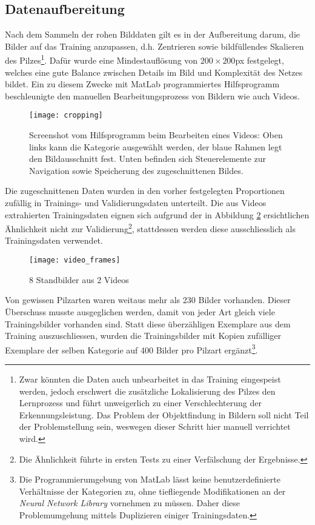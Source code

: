 \subsection{Datenaufbereitung} \label{cha:met:preprocessing}
Nach dem Sammeln der rohen Bilddaten gilt es in der Aufbereitung darum, die Bilder auf das Training anzupassen, d.h. Zentrieren sowie bildfüllendes Skalieren des Pilzes\footnote{Zwar könnten die Daten auch unbearbeitet in das Training eingespeist werden, jedoch erschwert die zusätzliche Lokalisierung des Pilzes den Lernprozess und führt unweigerlich zu einer Verschlechterung der Erkennungsleistung. Das Problem der Objektfindung in Bildern soll nicht Teil der Problemstellung sein, weswegen dieser Schritt hier manuell verrichtet wird.}. Dafür wurde eine Mindestauflösung von $200 \times 200$px festgelegt, welches eine gute Balance zwischen Details im Bild und Komplexität des Netzes bildet. Ein zu diesem Zwecke mit MatLab programmiertes Hilfsprogramm beschleunigte den manuellen Bearbeitungsprozess von Bildern wie auch Videos.
\begin{figure}[h]
	\centering
	\texttt{[image: cropping]}
	\caption[\textit{\textit{Hilfsprogramm}}]{Screenshot vom Hilfsprogramm beim Bearbeiten eines Videos: Oben links kann die Kategorie ausgewählt werden, der blaue Rahmen legt den Bildausschnitt fest. Unten befinden sich Steuerelemente zur Navigation sowie Speicherung des zugeschnittenen Bildes.}
	\label{img:precrocessing}
\end{figure}

Die zugeschnittenen Daten wurden in den vorher festgelegten Proportionen zufällig in Trainings- und Validierungsdaten unterteilt. Die aus Videos extrahierten Trainingsdaten eignen sich aufgrund der in Abbildung \ref{img:video_frames} ersichtlichen Ähnlichkeit nicht zur Validierung\footnote{Die Ähnlichkeit führte in ersten Tests zu einer Verfälschung der Ergebnisse.}, stattdessen werden diese ausschliesslich als Trainingsdaten verwendet.

\begin{figure}[h]
	\centering
	\texttt{[image: video\_frames]}
	\caption[\textit{\textit{Video-Frames}}]{8 Standbilder aus 2 Videos}
	\label{img:video_frames}
\end{figure}

Von gewissen Pilzarten waren weitaus mehr als 230 Bilder vorhanden. Dieser Überschuss musste ausgeglichen werden, damit von jeder Art gleich viele Trainingsbilder vorhanden sind. Statt diese überzähligen Exemplare aus dem Training auszuschliessen, wurden die Trainingsbilder mit Kopien zufälliger Exemplare der selben Kategorie auf 400 Bilder pro Pilzart ergänzt\footnote{Die Programmierumgebung von MatLab lässt keine benutzerdefinierte Verhältnisse der Kategorien zu, ohne tiefliegende Modifikationen an der \textit{Neural Network Library} vornehmen zu müssen. Daher diese Problemumgehung mittels Duplizieren einiger Trainingsdaten.}.


